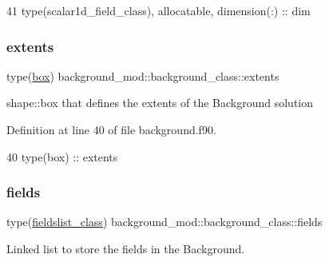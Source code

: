 \begin{DoxyCode}
41         \textcolor{keywordtype}{type}(scalar1d\_field\_class), \textcolor{keywordtype}{allocatable}, \textcolor{keywordtype}{dimension(:)} :: dim
\end{DoxyCode}
\mbox{\label{structbackground__mod_1_1background__class_acaaef54168dbee2731a99d0852844844}} 
\subsubsection{\texorpdfstring{extents}{extents}}
{\footnotesize\ttfamily type(\mbox{\hyperlink{structgeometry__mod_1_1box}{box}}) background\+\_\+mod\+::background\+\_\+class\+::extents\hspace{0.3cm}{\ttfamily [private]}}



shape\+::box that defines the extents of the Background solution 



Definition at line 40 of file background.\+f90.


\begin{DoxyCode}
40         \textcolor{keywordtype}{type}(box) :: extents
\end{DoxyCode}
\mbox{\label{structbackground__mod_1_1background__class_a68b750f0476dc75b886638a45a45f8f6}} 
\subsubsection{\texorpdfstring{fields}{fields}}
{\footnotesize\ttfamily type(\mbox{\hyperlink{structbackground__mod_1_1fieldslist__class}{fieldslist\+\_\+class}}) background\+\_\+mod\+::background\+\_\+class\+::fields\hspace{0.3cm}{\ttfamily [private]}}



Linked list to store the fields in the Background. 



